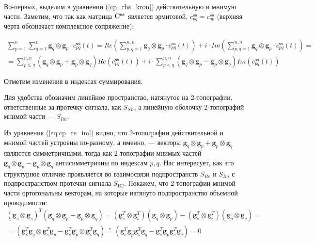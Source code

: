 Во-первых, выделим в уравнении (\ref{cp_rhs_kron}) действительную и мнимую части.
Заметим, что так как матрица $\mathbf{C}^{\mathbf{s s}}$ является эрмитовой,
$c^{\mathbf{ss}}_{pq} = \overline{c^{\mathbf{ss}}_{qp}}$ (верхняя черта обозначает комплексное сопряжение):

\begin{gather}
    \sum\limits_{p=1}^n\sum\limits_{q=1}^n \mathbf{g}_q\otimes \mathbf{g}_p \cdot c_{pq}^{\mathbf{ss}}(t) =
    Re\left(\sum\limits_{p,q=1}^{n,n} \mathbf{g}_q\otimes \mathbf{g}_p \cdot c_{pq}^{\mathbf{ss}}(t)\right) +
     i \cdot Im\left(\sum\limits_{p,q=1}^{n,n}
     \mathbf{g}_q\otimes \mathbf{g}_p \cdot c_{pq}^{\mathbf{ss}}(t)\right) = \nonumber \\
           = \sum\limits_{p\leq q}^{n,n} (\mathbf{g}_q\otimes \mathbf{g}_p + \mathbf{g}_p\otimes \mathbf{g}_q)
           Re\left(c_{pq}^{\mathbf{ss}}(t)\right) +
     i \cdot \sum\limits_{p<q}^{n,n} (\mathbf{g}_q\otimes \mathbf{g}_p - \mathbf{g}_p\otimes \mathbf{g}_q)
           Im\left(c_{pq}^{\mathbf{ss}}(t)\right)
    \label{eq:cp_re_im}
\end{gather}

Отметим изменения в индексах суммирования.

Для удобства обозначим линейное пространство, натянутое на 2-топографии, ответственные за протечку сигнала, как
$S_{SL}$, а линейную оболочку 2-топографий мнимой части --- $S_{Im}$.

Из уравнения (\ref{eq:cp_re_im}) видно, что 2-топографии действительной и мнимой частей устроены по-разному,
а именно, --- векторы $\mathbf{g}_q \otimes \mathbf{g}_p + \mathbf{g}_p \otimes \mathbf{g}_q$
являются симметричными, тогда как 2-топографии мнимых частей
$\mathbf{g}_q \otimes \mathbf{g}_p - \mathbf{g}_p \otimes \mathbf{g}_q$ антисимметричны по индексам $p, q$.
Нас интересует, как это структурное отличие проявляется во взаимосвязи подпространств $S_{Re}$ и $S_{Im}$ с
подпространством протечки сигнала $S_{VC}$.
Покажем, что  2-топографии мнимой части ортогональны векторам,
на которые натянуто подпространство объемной проводимости:
\begin{gather}
    (\mathbf{g}_s \otimes \mathbf{g}_s)^T(\mathbf{g}_q \otimes \mathbf{g}_p - \mathbf{g}_p \otimes \mathbf{g}_q) =
        (\mathbf{g}_s^T \otimes \mathbf{g}_s^T)(\mathbf{g}_q \otimes \mathbf{g}_p) -
        (\mathbf{g}_s^T \otimes \mathbf{g}_s^T)(\mathbf{g}_p \otimes \mathbf{g}_q) = \nonumber \\
       =(\mathbf{g}_s^T \mathbf{g}_q \otimes \mathbf{g}_s^T \mathbf{g}_p -
         \mathbf{g}_s^T \mathbf{g}_p \otimes \mathbf{g}_s^T \mathbf{g}_q) \stackrel{*}{=}
        (\mathbf{g}_s^T \mathbf{g}_p \mathbf{g}_s^T \mathbf{g}_q -
         \mathbf{g}_s^T \mathbf{g}_p \mathbf{g}_s^T \mathbf{g}_q) = 0
         \label{eq:vc_ort_im}
\end{gather}


